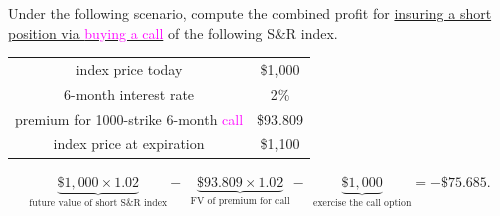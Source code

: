 \begin{frame}[fragile]
	\begin{myexample}
		Under the following scenario, compute the combined profit for \underline{insuring a short
		position via \textcolor{magenta}{buying a call}} of the following S\&R index.

		\begin{center}
			\renewcommand{\arraystretch}{1.2}
			\begin{tabular}{|c|c|}
				\hline
				index price today                                         & \$1,000  \\
				6-month interest rate                                     & 2\%      \\
				premium for 1000-strike 6-month \textcolor{magenta}{call} & \$93.809 \\ \hline
				index price at expiration                                 & \$1,100  \\ \hline
			\end{tabular}
		\end{center}
	\end{myexample}
	\vfill
	\pause
	\begin{mysol}
		\begin{align*}
			\underbrace{\$1,000 \times 1.02}_{\text{future value of short S\&R index}} - \: \:
			\underbrace{\$93.809 \times 1.02}_{\text{FV of premium for call}} - \:\:
			\underbrace{\$1,000}_{\text{exercise the call option}}
			= -\$75.685.
		\end{align*}
		\myEnd
	\end{mysol}
\end{frame}
